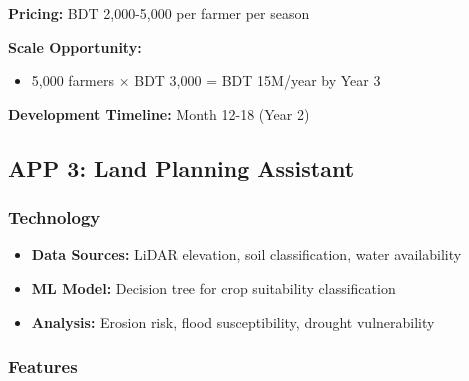 \textbf{Pricing:} BDT 2,000-5,000 per farmer per season

\textbf{Scale Opportunity:}
\begin{itemize}
    \item 5,000 farmers × BDT 3,000 = BDT 15M/year by Year 3
\end{itemize}

\textbf{Development Timeline:} Month 12-18 (Year 2)

\subsection{APP 3: Land Planning Assistant}

\subsubsection{Technology}

\begin{itemize}
    \item \textbf{Data Sources:} LiDAR elevation, soil classification, water availability
    \item \textbf{ML Model:} Decision tree for crop suitability classification
    \item \textbf{Analysis:} Erosion risk, flood susceptibility, drought vulnerability
\end{itemize}

\subsubsection{Features}

